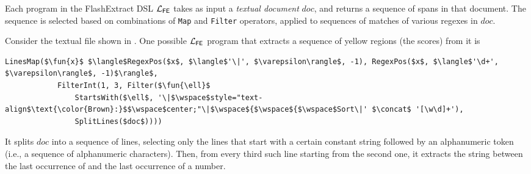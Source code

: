 Each program in the FlashExtract DSL $\mathcal{L}_{\mathsf{FE}}$ takes as input a \emph{textual document} $doc$, and returns a sequence
of spans in that document.
The sequence is selected based on combinations of \texttt{Map} and \texttt{Filter} operators, applied to sequences of
matches of various regexes in $doc$.

\begin{sidewaysfigure}[p!]
    \centering
    \uwsinglespace
    \begin{tcbraster}[beamer, raster columns=1, size=minimal]
    \end{tcbraster}
    \caption{An illustrative scenario for data extraction from semi-structured text using FlashExtract.}
    \label{fig:example:flashextract}
\end{sidewaysfigure}

\begin{example}
    \label{ex:background:fe}
    Consider the textual file shown in .
    One possible $\mathcal{L}_{\mathsf{FE}}$ program that extracts a sequence of yellow regions (the scores) from it is
    \begin{lstlisting}[language=dsl, gobble=8]
        LinesMap($\fun{x}$ $\langle$RegexPos($x$, $\langle$'\|', $\varepsilon\rangle$, -1), RegexPos($x$, $\langle$'\d+', $\varepsilon\rangle$, -1)$\rangle$,
            FilterInt(1, 3, Filter($\fun{\ell}$
                StartsWith($\ell$, '\|$\wspace$style="text-align$\text{\color{Brown}:}$$\wspace$center;"\|$\wspace${$\wspace${$\wspace$Sort\|' $\concat$ '[\w\d]+'),
                SplitLines($doc$))))
    \end{lstlisting}
    It splits $doc$ into a sequence of lines, selecting only the lines that start with a certain constant string
    followed by an alphanumeric token (i.e., a sequence of alphanumeric characters).
    Then, from every third such line starting from the second one, it extracts the string between the last occurrence of
    \stringliteral{|} and the last occurrence of a number.
\end{example}


